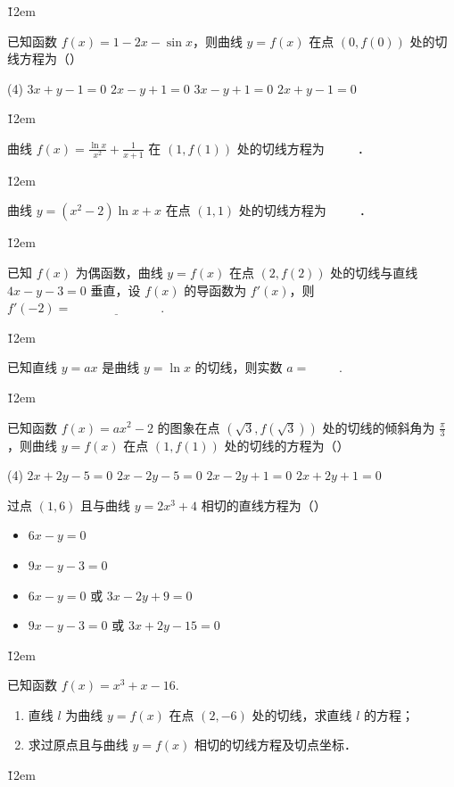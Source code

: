 \v{12em}

\begin{example}
    已知函数 $f(x) = 1 - 2x - \sin x$，则曲线 $y = f(x)$ 在点 $(0,f(0))$ 处的切线方程为（\quad）
    \begin{tasks}(4)
        \task $3x + y - 1 = 0$
        \task $2x - y + 1 = 0$
        \task $3x - y + 1 = 0$
        \task $2x + y - 1 = 0$
    \end{tasks}
\end{example}

\v{12em}

\begin{example}
    曲线 $f(x)=\frac{\ln x}{x^2}+\frac{1}{x+1}$ 在 $(1, f(1))$ 处的切线方程为
    \underline{$\qquad$} ．
\end{example}

\v{12em}

\begin{example}
    曲线 $y=\left(x^2-2\right) \ln x+x$ 在点 $(1,1)$ 处的切线方程为 \underline{$\qquad$} ．
\end{example}

\v{12em}

\begin{example}
    已知 $f(x)$ 为偶函数，曲线 $y = f(x)$ 在点 $(2,f(2))$ 处的切线与直线 $4x - y - 3 = 0$ 垂直，设 $f(x)$ 的导函数为 $f'(x)$，则 $f'(-2) = \underline{\hspace{3cm}}$.
\end{example}

\v{12em}

\begin{example}
    已知直线 $y=a x$ 是曲线 $y=\ln x$ 的切线，则实数 $a=$ \underline{$\qquad$}.
\end{example}

\v{12em}

\begin{example}
    已知函数 $f(x)=a x^2-2$ 的图象在点 $(\sqrt{3}, f(\sqrt{3}))$ 处的切线的倾斜角为 $\frac{\pi}{3}$ ，则曲线 $y=f(x)$ 在点 $(1, f(1))$ 处的切线的方程为（\quad）
    \begin{tasks}(4)
        \task $2 x+2 y-5=0$
        \task $2 x-2 y-5=0$
        \task $2 x-2 y+1=0$
        \task $2 x+2 y+1=0$
    \end{tasks}
\end{example}

\begin{example}
    过点 $(1,6)$ 且与曲线 $y=2 x^3+4$ 相切的直线方程为（\quad）
    \begin{itemize}
        \item $6 x-y=0$
        \item $9 x-y-3=0$
        \item $6 x-y=0$ 或 $3 x-2 y+9=0$
        \item $9 x-y-3=0$ 或 $3 x+2 y-15=0$
    \end{itemize}
\end{example}

\v{12em}

\begin{example}
    已知函数 $f(x) = x^{3} + x - 16$.
    \begin{enumerate}
        \item[(1)] 直线 $l$ 为曲线 $y = f(x)$ 在点 $(2, -6)$ 处的切线，求直线 $l$ 的方程；
        \item[(2)] 求过原点且与曲线 $y = f(x)$ 相切的切线方程及切点坐标．
    \end{enumerate}
\end{example}

\v{12em}